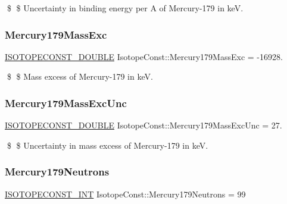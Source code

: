 \$ \$ Uncertainty in binding energy per A of Mercury-\/179 in keV. \mbox{\label{group___isotope_const-_mercury-_hg179_ga63e5b6292795ff34a0148f876f560689}} 
\subsubsection{\texorpdfstring{Mercury179\+Mass\+Exc}{Mercury179MassExc}}
{\footnotesize\ttfamily \mbox{\hyperlink{group___isotope_const-_macros_ga8f45a7272ce02c0b4c65c44636ed719a}{I\+S\+O\+T\+O\+P\+E\+C\+O\+N\+S\+T\+\_\+\+D\+O\+U\+B\+LE}} Isotope\+Const\+::\+Mercury179\+Mass\+Exc = -\/16928.}

\$ \$ Mass excess of Mercury-\/179 in keV. \mbox{\label{group___isotope_const-_mercury-_hg179_ga8c60eeac575ecc215530642064e967de}} 
\subsubsection{\texorpdfstring{Mercury179\+Mass\+Exc\+Unc}{Mercury179MassExcUnc}}
{\footnotesize\ttfamily \mbox{\hyperlink{group___isotope_const-_macros_ga8f45a7272ce02c0b4c65c44636ed719a}{I\+S\+O\+T\+O\+P\+E\+C\+O\+N\+S\+T\+\_\+\+D\+O\+U\+B\+LE}} Isotope\+Const\+::\+Mercury179\+Mass\+Exc\+Unc = 27.}

\$ \$ Uncertainty in mass excess of Mercury-\/179 in keV. \mbox{\label{group___isotope_const-_mercury-_hg179_ga9f6f4753f11f158e0c1d64b98c020d7a}} 
\subsubsection{\texorpdfstring{Mercury179\+Neutrons}{Mercury179Neutrons}}
{\footnotesize\ttfamily \mbox{\hyperlink{group___isotope_const-_macros_ga5f18360b3e99483a35c32d789e62621c}{I\+S\+O\+T\+O\+P\+E\+C\+O\+N\+S\+T\+\_\+\+I\+NT}} Isotope\+Const\+::\+Mercury179\+Neutrons = 99}

